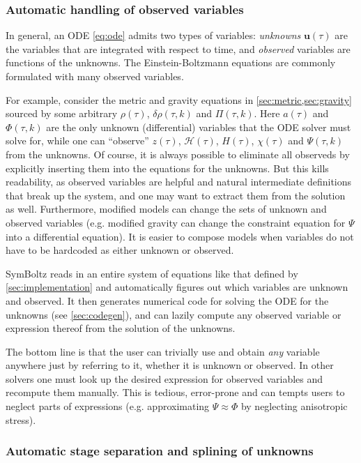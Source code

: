 \documentclass{aa}
\newcommand\scrH{\mathscr{H}}
\begin{document}
\subsubsection{Automatic handling of observed variables}
\label{sec:observed}

In general, an ODE \eqref{eq:ode} admits two types of variables: \textit{unknowns} $\mathbf{u}(\tau)$ are the variables that are integrated with respect to time, and \textit{observed} variables are functions of the unknowns.
The Einstein-Boltzmann equations are commonly formulated with many observed variables.

For example, consider the metric and gravity equations in \cref{sec:metric,sec:gravity} sourced by some arbitrary $\rho(\tau)$, $\delta\rho(\tau,k)$ and $\Pi(\tau,k)$.
Here $a(\tau)$ and $\Phi(\tau,k)$ are the only unknown (differential) variables that the ODE solver must solve for,
while one can \enquote{observe} $z(\tau)$, $\scrH(\tau)$, $H(\tau)$, $\chi(\tau)$ and $\Psi(\tau,k)$ from the unknowns.
Of course, it is always possible to eliminate all observeds by explicitly inserting them into the equations for the unknowns.
But this kills readability, as observed variables are helpful and natural intermediate definitions that break up the system, and one may want to extract them from the solution as well.
Furthermore, modified models can change the sets of unknown and observed variables (e.g. modified gravity can change the constraint equation for $\Psi$ into a differential equation).
It is easier to compose models when variables do not have to be hardcoded as either unknown or observed.

SymBoltz reads in an entire system of equations like that defined by \cref{sec:implementation} and automatically figures out which variables are unknown and observed.
It then generates numerical code for solving the ODE for the unknowns (see \cref{sec:codegen}),
and can lazily compute any observed variable or expression thereof from the solution of the unknowns.

The bottom line is that the user can trivially use and obtain \textit{any} variable anywhere just by referring to it, whether it is unknown or observed.
In other solvers one must look up the desired expression for observed variables and recompute them manually.
This is tedious, error-prone and can tempts users to neglect parts of expressions (e.g. approximating $\Psi \approx \Phi$ by neglecting anisotropic stress).

\subsubsection{Automatic stage separation and splining of unknowns}
\label{sec:splining}
\end{document}
